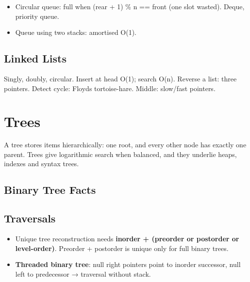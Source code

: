 \begin{itemize}
\tightlist
\item
  Circular queue: full when (rear + 1) \% n == front (one slot wasted). Deque, priority queue.
\item
  Queue using two stacks: amortised O(1).
\end{itemize}

\needspace{227pt}

\hypertarget{p2-07--24-linked-lists}{%
\subsection{Linked Lists}\label{p2-07--24-linked-lists}}

Singly, doubly, circular. Insert at head O(1); search O(n). Reverse a list: three pointers. Detect cycle: Floyd\textquotesingle s tortoise-hare. Middle: slow/fast pointers.

\needspace{161pt}

\hypertarget{p2-07--3-trees}{%
\section{Trees}\label{p2-07--3-trees}}

A tree stores items hierarchically: one root, and every other node has exactly one parent. Trees give
logarithmic search when balanced, and they underlie heaps, indexes and syntax trees.

\needspace{95pt}

\hypertarget{p2-07--31-binary-tree-facts}{%
\subsection{Binary Tree Facts}\label{p2-07--31-binary-tree-facts}}



\needspace{95pt}

\hypertarget{p2-07--32-traversals}{%
\subsection{Traversals}\label{p2-07--32-traversals}}



\begin{itemize}
\tightlist
\item
  Unique tree reconstruction needs \textbf{inorder + (preorder or postorder or level-order)}. Preorder + postorder is unique only for full binary trees.
\item
  \textbf{Threaded binary tree}: null right pointers point to inorder successor, null left to predecessor → traversal without stack.
\end{itemize}

